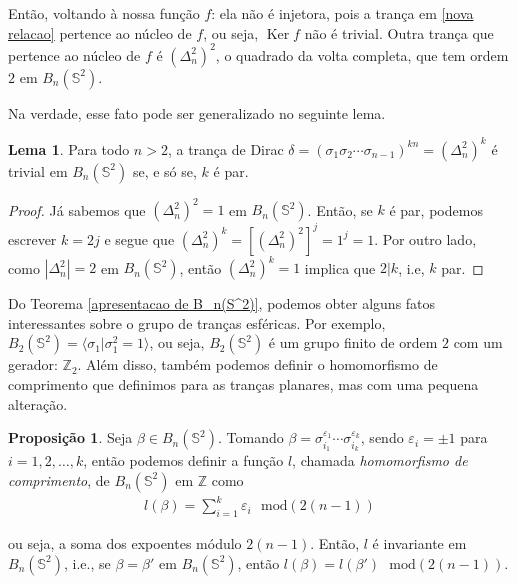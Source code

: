 \documentclass[a4paper,portuguese,11pt,twoside, leqno]{book}
\DeclareMathOperator{\Ker}{Ker}
\theoremstyle{definition}
\newtheorem{lemma}[theorem]{Lema}
\newtheorem{prop}{Proposição}[section]
\begin{document}
	\par\vspace{0.3cm} Então, voltando à nossa função $f$: ela não é injetora, pois a trança em \eqref{nova relacao} pertence ao núcleo de $f$, ou seja, $\Ker f$ não é trivial. Outra trança que pertence ao núcleo de $f$ é $\displaystyle{(\Delta_n^2)^2}$, o quadrado da volta completa, que tem ordem $2$ em $B_n(\mathbb{S}^2)$.
	\par\vspace{0.3cm} Na verdade, esse fato pode ser generalizado no seguinte lema.
	
	\begin{lemma}
		\label{potencia da volta completa trivial}
		Para todo $n> 2$, a trança de Dirac $\delta = (\sigma_1\sigma_2\cdots\sigma_{n-1})^{kn} = (\Delta_n^2)^k$ é trivial em $B_n(\mathbb{S}^2)$ se, e só se, $k$ é par. 
	\end{lemma}
	
	\begin{proof}
		Já sabemos que $(\Delta_n^2)^2 = 1$ em $B_n(\mathbb{S}^2)$. Então, se $k$ é par, podemos escrever $k=2j$ e segue que $(\Delta_n^2)^k = [(\Delta_n^2)^2]^j = 1^j = 1$. Por outro lado, como $|\Delta_n^2| = 2$ em $B_n(\mathbb{S}^2)$, então $(\Delta_n^2)^k = 1$ implica que $2|k$, i.e, $k$ par.
	\end{proof}
	\par\vspace{0.3cm} Do Teorema \eqref{apresentacao de B_n(S^2)}, podemos obter alguns fatos interessantes sobre o grupo de tranças esféricas. Por exemplo, $B_2(\mathbb{S}^2) = \langle \sigma_1|\sigma_1^2=1 \rangle$, ou seja, $B_2(\mathbb{S}^2)$ é um grupo finito de ordem $2$ com um gerador: $\mathbb{Z}_2$. Além disso, também podemos definir o homomorfismo de comprimento que definimos para as tranças planares, mas com uma pequena alteração.
	
	\begin{prop}
		\label{homomorfismo de comprimento em trancas esfericas}
		Seja $\beta\in B_n(\mathbb{S}^2)$. Tomando $\beta = \sigma_{i_1}^{\varepsilon_1}\cdots\sigma_{i_k}^{\varepsilon_k}$, sendo $\varepsilon_i = \pm1$ para $i=1,2,\dots,k$, então podemos definir a função $l$, chamada \textit{homomorfismo de comprimento}, de $B_n(\mathbb{S}^2)$ em $\mathbb{Z}$ como	
		\begin{align*}
		l(\beta) = \sum_{i=1}^{k}\varepsilon_i\text{ }\mathrm{mod}(2(n-1))
		\end{align*}
		\par\vspace{0.3cm} ou seja, a soma dos expoentes módulo $2(n-1)$. Então, $l$ é invariante em $B_n(\mathbb{S}^2)$, i.e., se $\beta = \beta'$ em $B_n(\mathbb{S}^2)$, então $l(\beta) = l(\beta')\text{ }\mathrm{mod}(2(n-1))$.
	\end{prop}
	
\end{document}
